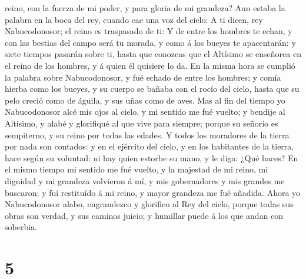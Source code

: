 reino, con la fuerza de mi poder, y para gloria de mi grandeza?
 Aun estaba la palabra en la boca del rey, cuando cae una
voz del cielo: A ti dicen, rey Nabucodonosor; el reino es traspasado de
ti:  Y de entre los hombres te echan, y con las bestias
del campo será tu morada, y como á los bueyes te apacentarán: y siete
tiempos pasarán sobre ti, hasta que conozcas que el Altísimo se
enseñorea en el reino de los hombres, y á quien él quisiere lo da.
 En la misma hora se cumplió la palabra sobre
Nabucodonosor, y fué echado de entre los hombres; y comía hierba como
los bueyes, y su cuerpo se bañaba con el rocío del cielo, hasta que su
pelo creció como de águila, y sus uñas como de aves.  Mas
al fin del tiempo yo Nabucodonosor alcé mis ojos al cielo, y mi sentido
me fué vuelto; y bendije al Altísimo, y alabé y glorifiqué al que vive
para siempre; porque su señorío es sempiterno, y su reino por todas las
edades.  Y todos los moradores de la tierra por nada son
contados: y en el ejército del cielo, y en los habitantes de la tierra,
hace según su voluntad: ni hay quien estorbe su mano, y le diga: ¿Qué
haces?  En el mismo tiempo mi sentido me fué vuelto, y la
majestad de mi reino, mi dignidad y mi grandeza volvieron á mí, y mis
gobernadores y mis grandes me buscaron; y fuí restituído á mi reino, y
mayor grandeza me fué añadida.  Ahora yo Nabucodonosor
alabo, engrandezco y glorifico al Rey del cielo, porque todas sus obras
son verdad, y sus caminos juicio; y humillar puede á los que andan con
soberbia.

\hypertarget{section-4}{%
\section{5}\label{section-4}}

